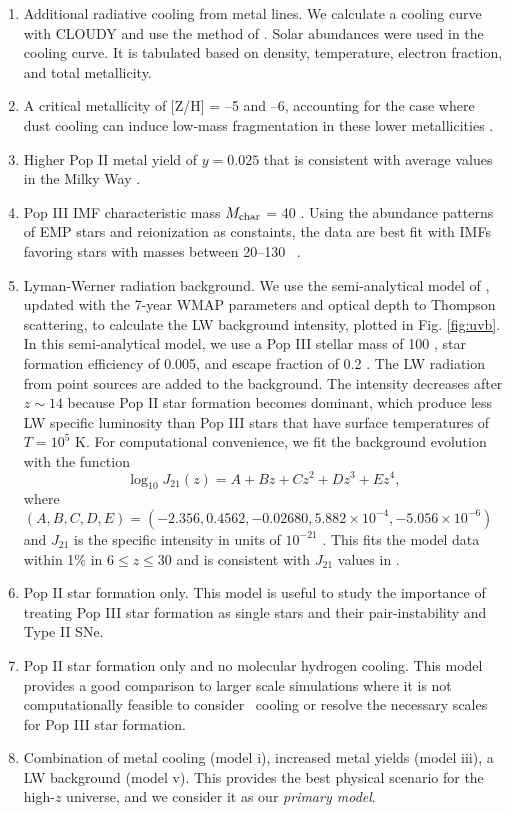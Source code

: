 \documentclass[useAMS,usenatbib]{mn2e}
\begin{document}
\begin{enumerate}
\item Additional radiative cooling from metal lines.  We calculate a
  cooling curve with CLOUDY \citep{CLOUDY} and use the method of
  \citep{2008MNRAS.385.1443S}.  Solar abundances were used in the
  cooling curve.  It is tabulated based on density, temperature,
  electron fraction, and total metallicity.
\item A critical metallicity of [Z/H] = --5 and --6, accounting for
  the case where dust cooling can induce low-mass fragmentation in
  these lower metallicities \citep{Omukai05, Schneider06_Frag}.
\item Higher Pop II metal yield of $y = 0.025$ that is consistent with
  average values in the Milky Way \citep{Madau96}.
\item Pop III IMF characteristic mass $M_{\rm char}$ = 40 \Ms.  Using
  the abundance patterns of EMP stars and reionization as constaints,
  the data are best fit with IMFs favoring stars with masses between
  20--130 \Ms~\citep{Umeda03, Tumlinson06}.
\item Lyman-Werner radiation background.  We use the semi-analytical
  model of \citet{Wise05}, updated with the 7-year WMAP parameters and
  optical depth to Thompson scattering, to calculate the LW background
  intensity, plotted in Fig. \ref{fig:uvb}.  In this semi-analytical
  model, we use a Pop III stellar mass of 100 \Ms, star formation
  efficiency of 0.005, and escape fraction of 0.2 \citep{Wise09}.  The
  LW radiation from point sources are added to the background.  The
  intensity decreases after $z \sim 14$ because Pop II star formation
  becomes dominant, which produce less LW specific luminosity than Pop
  III stars that have surface temperatures of $T = 10^5$ K.  For
  computational convenience, we fit the background evolution with the
  function
%
  \begin{equation}
    \label{eqn:uvb}
    \log_{10} J_{21}(z) = A + Bz + Cz^2 + Dz^3 + Ez^4,
  \end{equation}
%
  where $(A,B,C,D,E) = (-2.356, 0.4562, -0.02680, 5.882 \times 10^{-4},
  -5.056 \times 10^{-6})$ and $J_{21}$ is the specific intensity in
  units of $10^{-21}$ \emis.  This fits the
  model data within 1\% in $6 \le z \le 30$ and is consistent with
  $J_{21}$ values in \citet{Trenti09_SFR}.
\item Pop II star formation only.  This model is useful to study the
  importance of treating Pop III star formation as single stars and
  their pair-instability and Type II SNe.
\item Pop II star formation only and no molecular hydrogen cooling.
  This model provides a good comparison to larger scale simulations
  where it is not computationally feasible to consider \hh~cooling or
  resolve the necessary scales for Pop III star formation.
\item Combination of metal cooling (model i), increased metal yields
  (model iii), a LW background (model v).  This provides the best
  physical scenario for the high-$z$ universe, and we consider it as
  our \textit{primary model}.
\end{enumerate}
\end{document}
